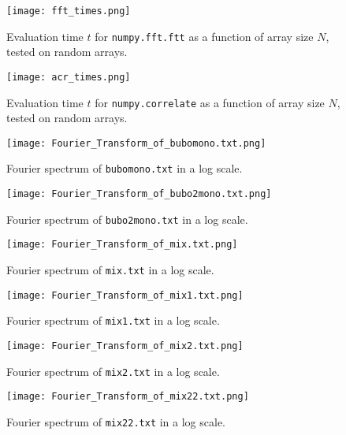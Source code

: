 \documentclass[10pt,a4paper,twocolumn]{article}
\begin{document}
\begin{figure}
\centering
\captionsetup{justification=centering}
\texttt{[image: fft\_times.png]}
\caption{Evaluation time $t$ for \texttt{numpy.fft.ftt} as a function of array size $N$, tested on random arrays.}
\label{fig:fft_times}
\end{figure}

\begin{figure}
\centering
\captionsetup{justification=centering}
\texttt{[image: acr\_times.png]}
\caption{Evaluation time $t$ for \texttt{numpy.correlate} as a function of array size $N$, tested on random arrays.}
\label{fig:acr_times}
\end{figure}


\begin{figure}
\centering
\captionsetup{justification=centering}
\texttt{[image: Fourier\_Transform\_of\_bubomono.txt.png]}
\caption{Fourier spectrum of \texttt{bubomono.txt} in a log scale.}
\label{fig:fft_bubomono}
\end{figure}

\begin{figure}
\centering
\captionsetup{justification=centering}
\texttt{[image: Fourier\_Transform\_of\_bubo2mono.txt.png]}
\caption{Fourier spectrum of \texttt{bubo2mono.txt} in a log scale.}
\label{fig:fft_bubo2mono}
\end{figure}

\begin{figure}
\centering
\captionsetup{justification=centering}
\texttt{[image: Fourier\_Transform\_of\_mix.txt.png]}
\caption{Fourier spectrum of \texttt{mix.txt} in a log scale.}
\label{fig:fft_mix}
\end{figure}

\begin{figure}
\centering
\captionsetup{justification=centering}
\texttt{[image: Fourier\_Transform\_of\_mix1.txt.png]}
\caption{Fourier spectrum of \texttt{mix1.txt} in a log scale.}
\label{fig:fft_mix1}
\end{figure}

\begin{figure}
\centering
\captionsetup{justification=centering}
\texttt{[image: Fourier\_Transform\_of\_mix2.txt.png]}
\caption{Fourier spectrum of \texttt{mix2.txt} in a log scale.}
\label{fig:fft_mix2}
\end{figure}

\begin{figure}
\centering
\captionsetup{justification=centering}
\texttt{[image: Fourier\_Transform\_of\_mix22.txt.png]}
\caption{Fourier spectrum of \texttt{mix22.txt} in a log scale.}
\label{fig:fft_mix22}
\end{figure}
\end{document}
